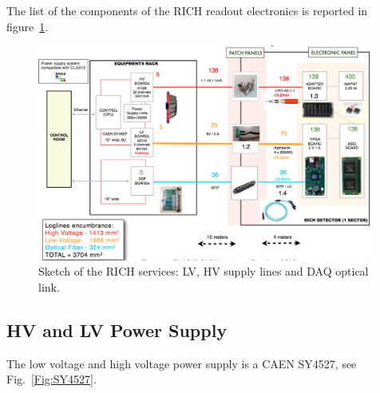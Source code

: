 \documentclass[12pt]{article}
\begin{document}
The list of the components of the RICH readout electronics is reported in figure~\ref{fig:RICH_services}.

\begin{figure}[h!]
\center
\includegraphics[width=0.99\textwidth]{pics/Services_HV_LV.png}
\caption{ \label{fig:RICH_services} Sketch of the RICH services: LV, HV supply lines and DAQ optical link.}
\end{figure}



\subsection{HV and LV Power Supply}

The low voltage and high voltage power supply is a CAEN SY4527, see Fig.~\ref{Fig:SY4527}. 
\end{document}
